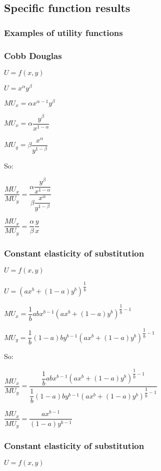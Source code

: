 
\subsection{Specific function results}

\subsubsection{Examples of utility functions}

\subsubsection{Cobb Douglas}

\(U=f(x,y)\)

\(U=x^\alpha y^\beta \)

\(MU_x=\alpha x^{\alpha -1}y^\beta \)

\(MU_x=\alpha \dfrac{y^\beta }{x^{1- \alpha }}\)

\(MU_y=\beta \dfrac{x^\alpha}{y^{1- \beta }}\)

So:

\(\dfrac{MU_x}{MU_y}=\dfrac{\alpha \dfrac{y^\beta }{x^{1- \alpha }} }{\beta \dfrac{x^\alpha}{y^{1- \beta }}}\)

\(\dfrac{MU_x}{MU_y}=\dfrac{\alpha }{\beta }\dfrac{y}{x}\)

\subsubsection{Constant elasticity of substitution}

\(U=f(x,y)\)

\(U=(ax^b+(1-a)y^b)^{\dfrac{1}{b}}\)

\(MU_x=\dfrac{1}{b}abx^{b-1}(ax^b+(1-a)y^b)^{\dfrac{1}{b}-1}\)

\(MU_y=\dfrac{1}{b}(1-a)by^{b-1}(ax^b+(1-a)y^b)^{\dfrac{1}{b}-1}\)

So:

\(\dfrac{MU_x}{MU_y}=\dfrac{\dfrac{1}{b}abx^{b-1}(ax^b+(1-a)y^b)^{\dfrac{1}{b}-1}}{\dfrac{1}{b}(1-a)by^{b-1}(ax^b+(1-a)y^b)^{\dfrac{1}{b}-1}}\)

\(\dfrac{MU_x}{MU_y}=\dfrac{ax^{b-1}}{ (1-a)y^{b-1}}\)

\subsubsection{Constant elasticity of substitution}

\(U=f(x,y)\)

